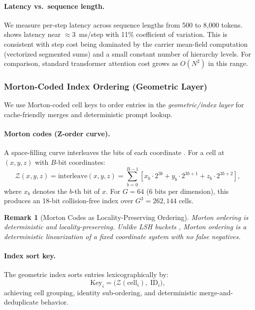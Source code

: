 \documentclass[11pt,a4paper]{article}
\newtheorem{remark}{Remark}
\begin{document}
\paragraph{Latency vs.\ sequence length.}
We measure per-step latency across sequence lengths from 500 to 8,000 tokens.  shows latency near ${\approx}$3~ms/step with 11\% coefficient of variation. This is consistent with step cost being dominated by the carrier mean-field computation (vectorized segmented sums) and a small constant number of hierarchy levels. For comparison, standard transformer attention cost grows as $O(N^2)$ in this range.

\subsubsection{Morton-Coded Index Ordering (Geometric Layer)}
\label{sec:morton_codes}

We use Morton-coded cell keys to order entries in the \emph{geometric/index layer} for cache-friendly merges and deterministic prompt lookup.

\paragraph{Morton codes (Z-order curve).}
A space-filling curve interleaves the bits of each coordinate \citep{morton1966computer, samet2006foundations}. For a cell at $(x, y, z)$ with $B$-bit coordinates:
\begin{equation}
\mathcal{Z}(x, y, z) = \text{interleave}(x, y, z) = \sum_{b=0}^{B-1} \left[ x_b \cdot 2^{3b} + y_b \cdot 2^{3b+1} + z_b \cdot 2^{3b+2} \right],
\label{eq:morton}
\end{equation}
where $x_b$ denotes the $b$-th bit of $x$. For $G = 64$ (6 bits per dimension), this produces an 18-bit collision-free index over $G^3 = 262{,}144$ cells.

\begin{remark}[Morton Codes as Locality-Preserving Ordering]
Morton ordering is deterministic and locality-preserving. Unlike LSH buckets \citep{kitaev2020reformer}, Morton ordering is a deterministic linearization of a fixed coordinate system with no false negatives.
\end{remark}

\paragraph{Index sort key.}
The geometric index sorts entries lexicographically by:
\begin{equation}
\text{Key}_i = \bigl(\mathcal{Z}(\text{cell}_i),\; \text{ID}_i\bigr),
\label{eq:index_key}
\end{equation}
achieving cell grouping, identity sub-ordering, and deterministic merge-and-deduplicate behavior.
\end{document}
